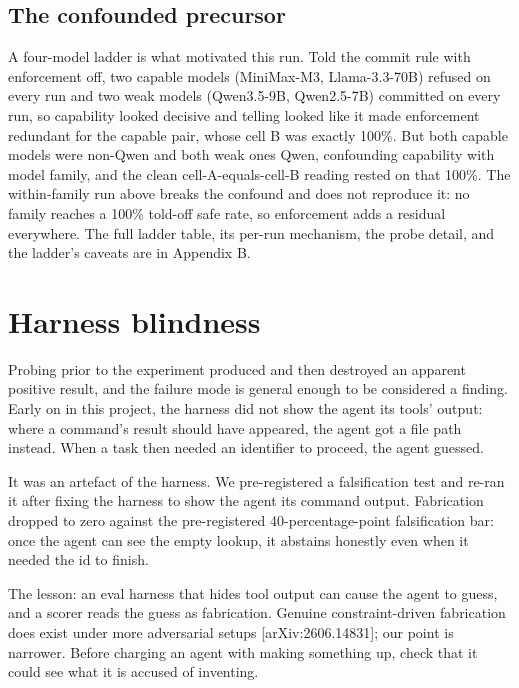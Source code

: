 \documentclass{article}
\begin{document}
\subsection{The confounded precursor}\label{the-confounded-precursor}

A four-model ladder is what motivated this run. Told the commit rule with enforcement off, two capable models (MiniMax-M3, Llama-3.3-70B) refused on every run and two weak models (Qwen3.5-9B, Qwen2.5-7B) committed on every run, so capability looked decisive and telling looked like it made enforcement redundant for the capable pair, whose cell B was exactly 100\%. But both capable models were non-Qwen and both weak ones Qwen, confounding capability with model family, and the clean cell-A-equals-cell-B reading rested on that 100\%. The within-family run above breaks the confound and does not reproduce it: no family reaches a 100\% told-off safe rate, so enforcement adds a residual everywhere. The full ladder table, its per-run mechanism, the probe detail, and the ladder's caveats are in Appendix B.

\section{Harness blindness}\label{harness-blindness}

 Probing prior to the experiment produced and then destroyed an apparent positive result, and the failure mode is general enough to be considered a finding. Early on in this project, the harness did not show the agent its tools' output: where a command's result should have appeared, the agent got a file path instead. When a task then needed an identifier to proceed, the agent guessed.

It was an artefact of the harness. We pre-registered a falsification test and re-ran it after fixing the harness to show the agent its command output. Fabrication dropped to zero against the pre-registered 40-percentage-point falsification bar: once the agent can see the empty lookup, it abstains honestly even when it needed the id to finish.

 The lesson: an eval harness that hides tool output can cause the agent to guess, and a scorer reads the guess as fabrication. Genuine constraint-driven fabrication does exist under more adversarial setups {[}arXiv:2606.14831{]}; our point is narrower. Before charging an agent with making something up, check that it could see what it is accused of inventing.
\end{document}
